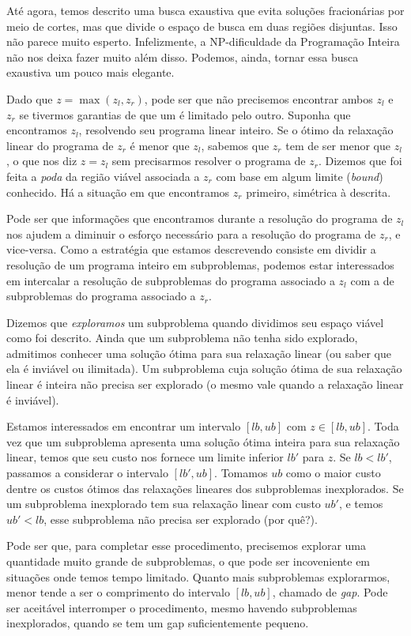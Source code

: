 \documentclass[]{article}
\numberwithin{equation}{section}
\begin{document}
Até agora, temos descrito uma busca exaustiva que evita soluções fracionárias por meio de cortes, mas
que divide o espaço de busca em duas regiões disjuntas.
Isso não parece muito esperto.
Infelizmente, a NP-dificuldade da Programação Inteira não nos deixa fazer muito além disso.
Podemos, ainda, tornar essa busca exaustiva um pouco mais elegante.

Dado que $z = \max (z_l, z_r)$, pode ser que não precisemos encontrar ambos $z_l$ e $z_r$ se tivermos
garantias de que um é limitado pelo outro.
Suponha que encontramos $z_l$, resolvendo seu programa linear inteiro.
Se o ótimo da relaxação linear do programa de $z_r$ é menor que $z_l$, sabemos que $z_r$ tem de ser
menor que $z_l$, o que nos diz $z = z_l$ sem precisarmos resolver o programa de $z_r$.
Dizemos que foi feita a \emph{poda} da região viável associada a $z_r$ com base em algum limite
(\emph{bound}) conhecido.
Há a situação em que encontramos $z_r$ primeiro, simétrica à descrita.

Pode ser que informações que encontramos durante a resolução do programa de $z_l$ nos ajudem a diminuir
o esforço necessário para a resolução do programa de $z_r$, e vice-versa.
Como a estratégia que estamos descrevendo consiste em dividir a resolução de um programa inteiro em
subproblemas, podemos estar interessados em intercalar a resolução de subproblemas do programa associado
a $z_l$ com a de subproblemas do programa associado a $z_r$.

Dizemos que \emph{exploramos} um subproblema quando dividimos seu espaço viável como foi descrito.
Ainda que um subproblema não tenha sido explorado, admitimos conhecer uma solução ótima para sua
relaxação linear (ou saber que ela é inviável ou ilimitada).
Um subproblema cuja solução ótima de sua relaxação linear é inteira não precisa ser explorado
(o mesmo vale quando a relaxação linear é inviável).

Estamos interessados em encontrar um intervalo $[lb, ub]$ com $z \in [lb, ub]$.
Toda vez que um subproblema apresenta uma solução ótima inteira para sua relaxação linear, temos que seu
custo nos fornece um limite inferior $lb'$ para $z$.
Se $lb < lb'$, passamos a considerar o intervalo $[lb', ub]$.
Tomamos $ub$ como o maior custo dentre os custos ótimos das relaxações lineares dos subproblemas
inexplorados.
Se um subproblema inexplorado tem sua relaxação linear com custo $ub'$, e temos $ub' < lb$, esse
subproblema não precisa ser explorado (por quê?).

Pode ser que, para completar esse procedimento, precisemos explorar uma quantidade muito grande de
subproblemas, o que pode ser incoveniente em situações onde temos tempo limitado.
Quanto mais subproblemas explorarmos, menor tende a ser o comprimento do intervalo $[lb, ub]$, chamado
de \emph{gap}.
Pode ser aceitável interromper o procedimento, mesmo havendo subproblemas inexplorados, quando se tem um
gap suficientemente pequeno.
\end{document}

